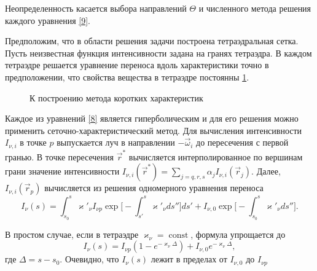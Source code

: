 Неопределенность касается выбора направлений $\Theta$ и численного метода решения каждого уравнения \eqref{9}.

Предположим, что в области решения задачи построена тетраэдральная сетка.
Пусть неизвестная функция интенсивности задана на гранях тетраэдра. В каждом тетраэдре решается уравнение переноса вдоль характеристики точно в предположении, что свойства вещества в тетраэдре постоянны \ref{fig:3}. 

\begin{figure}[ht!]
\caption{К построению метода коротких характеристик}
\label{fig:3}
\end{figure}

Каждое из уравнений \eqref{8} является гиперболическим и для его решения можно применить сеточно-характеристический метод. Для вычисления интенсивности $I_{\nu,i}$ в точке $p$ выпускается луч в направлении $-\vec\omega_i$ до пересечения с первой гранью. В точке пересечения $\vec r^*$ вычисляется интерполированное по вершинам грани значение интенсивности $I_{\nu, i} (\vec r^*) = \sum_{j = q,r,s} \alpha_jI_{\nu, i}(\vec r_j)$. Далее, $I_{\nu, i} (\vec r_p)$ вычисляется из решения одномерного уравнения переноса   
\begin {equation}
I_{\nu}(s) = \int_{s_0}^s\varkappa'_{\nu}I_{\nu p} \exp\Big[-\int_{s'}^s\varkappa'_{\nu}ds''\Big]ds' + I_{\nu,0} \exp\Big[-\int_{s_0}^s \varkappa'_{\nu}ds''\Big].
\end {equation}

В простом случае, если в тетраэдре $\varkappa_\nu = \operatorname{const}$, формула упрощается до 
\begin {equation}
I_\nu (s) = I_{\nu p} \left(1 - e^{-\varkappa_\nu \Delta}\right) + I_{\nu,0}e^{-\varkappa_\nu \Delta},
\end {equation}
где $\Delta = s - s_0$. Очевидно, что $I_\nu(s)$ лежит в пределах от $I_{\nu, 0}$ до $I_{\nu p}$
